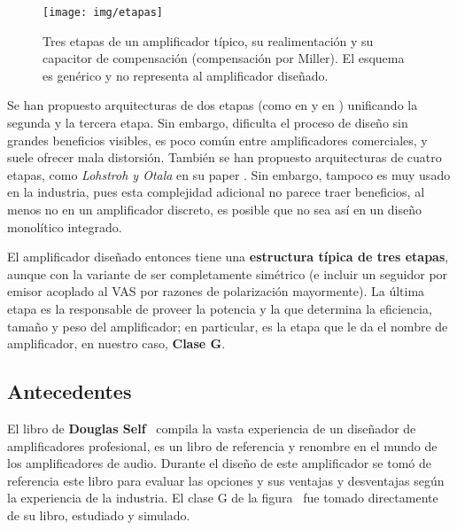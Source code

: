 \begin{figure}[H]
	\centering
	\texttt{[image: img/etapas]}
	\caption{Tres etapas de un amplificador típico, su realimentación y su capacitor de compensación (compensación por Miller). El esquema es genérico y no representa al amplificador diseñado.}
	\label{fig:etapas}
\end{figure}


Se han propuesto arquitecturas de dos etapas (como en \textbf{} y en \textbf{}) unificando la segunda y la tercera etapa. Sin embargo, dificulta el proceso de diseño sin grandes beneficios visibles, es poco común entre amplificadores comerciales, y suele ofrecer mala distorsión. También se han propuesto arquitecturas de cuatro etapas, como \textit{Lohstroh y Otala} en su paper \textbf{}. Sin embargo, tampoco es muy usado en la industria, pues esta complejidad adicional no parece traer beneficios, al menos no en un amplificador discreto, es posible que no sea así en un diseño monolítico integrado.


El amplificador diseñado entonces tiene una \textbf{estructura típica de tres etapas}, aunque con la variante de ser completamente simétrico (e incluir un seguidor por emisor acoplado al VAS por razones de polarización mayormente). La última etapa es la responsable de proveer la potencia y la que determina la eficiencia, tamaño y peso del amplificador; en particular, es la etapa que le da el nombre de amplificador, en nuestro caso, \textbf{Clase G}.


\subsection{Antecedentes}

El libro de \textbf{Douglas Self}~ compila la vasta experiencia de un diseñador de amplificadores profesional, es un libro de referencia y renombre en el mundo de los amplificadores de audio. Durante el diseño de este amplificador se tomó de referencia este libro para evaluar las opciones y sus ventajas y desventajas según la experiencia de la industria. El clase G de la figura~ fue tomado directamente de su libro, estudiado y simulado. 


